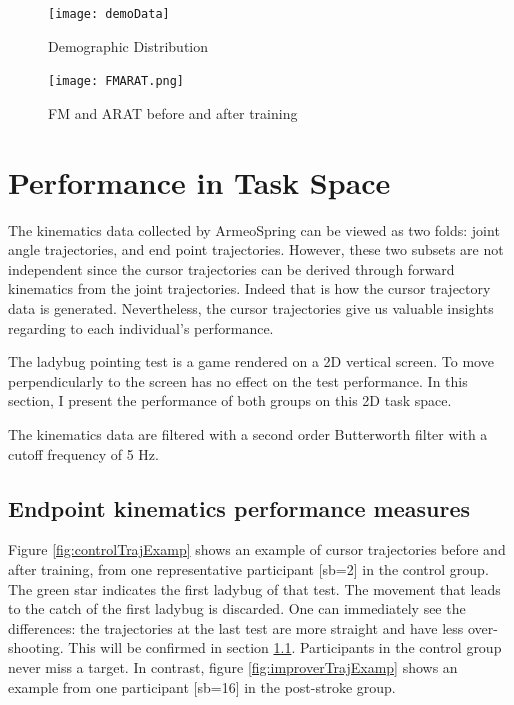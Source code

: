 \begin{figure} %
	\texttt{[image: demoData]}
	\centering
	\caption{Demographic Distribution}
	\medskip
	\small 
	\label{fig:demoData}
\end{figure}

\begin{figure} %
	\texttt{[image: FMARAT.png]}
	\centering
	\caption{FM and ARAT before and after training}
	\medskip
	\small 
	\label{fig:FMARAT}
\end{figure}


\section{Performance in Task Space}\label{sec:pertaskspace}

The kinematics data collected by ArmeoSpring can be viewed as two folds: joint angle trajectories, and end point trajectories. 
However, these two subsets are not independent since the cursor trajectories can be derived through forward kinematics from the joint trajectories. 
Indeed that is how the cursor trajectory data is generated. 
Nevertheless, the cursor trajectories give us valuable insights regarding to each individual's performance.

The ladybug pointing test is a game rendered on a 2D vertical screen. 
To move perpendicularly to the screen has no effect on the test performance. 
In this section, I present the performance of both groups on this 2D task space.

The kinematics data are filtered with a second order Butterworth filter with a cutoff frequency of 5 Hz.

\subsection{Endpoint kinematics performance measures}

Figure \ref{fig:controlTrajExamp} shows an example of cursor trajectories before and after training, from one representative participant [sb=2] in the control group. 
The green star indicates the first ladybug of that test. 
The movement that leads to the catch of the first ladybug is discarded. 
One can immediately see the differences: the trajectories at the last test are more straight and have less over-shooting. 
This will be confirmed in section \ref{}. 
Participants in the control group never miss a target.
In contrast, figure \ref{fig:improverTrajExamp} shows an example from one participant [sb=16] in the post-stroke group. 

